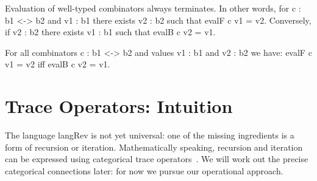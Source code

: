 \documentclass{llncs}
\begin{document}
\begin{definition}
\end{definition}

\begin{proposition}[Termination] Evaluation of well-typed combinators
  always terminates. In other words, for {{c : b1 <-> b2}} and 
  {{v1 : b1}} there exists {{v2 : b2}} such that {{evalF c v1 = v2}}. 
  Conversely, if {{v2 : b2}} there exists {{v1 : b1}} such that 
  {{evalB c v2 = v1}}.
\end{proposition}

\begin{proposition}
\label{prop:logrev}
For all combinators {{c : b1 <-> b2}} and values {{v1 : b1}} and 
{{v2 : b2}} we have: {{evalF c v1 = v2}} iff {{evalB c v2 = v1}}.
\end{proposition}

\section{Trace Operators: Intuition}

The language {{langRev}} is not yet universal: one of the missing
ingredients is a form of recursion or iteration. Mathematically
speaking, recursion and iteration can be expressed using categorical
trace
operators~\cite{joyal1996traced,Hasegawa:1997:RCS:645893.671607}. We
will work out the precise categorical connections later: for now we
pursue our operational approach.
\end{document}

